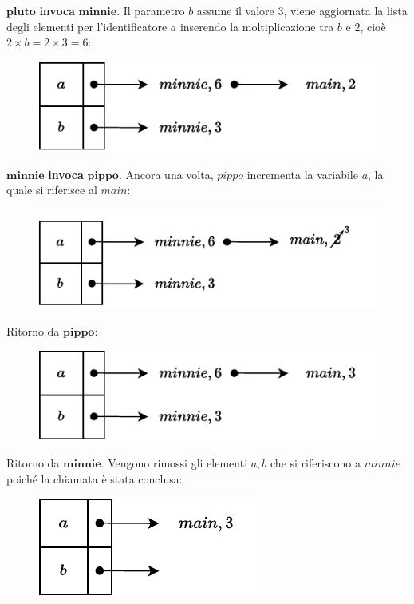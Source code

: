 \documentclass[a4paper]{article}
\begin{document}
	\noindent
	$\mathbf{pluto}$\textbf{ invoca }$\mathbf{minnie}$. Il parametro $b$ assume il valore $3$, viene aggiornata la lista degli elementi per l'identificatore $a$ inserendo la moltiplicazione tra $b$ e $2$, cioè $2 \times b = 2 \times 3 = 6$:
	\begin{figure}[!htp]
		\centering
		\includegraphics[width=.8\textwidth]{img/ex3-010.pdf}
	\end{figure}
	
	\noindent
	$\mathbf{minnie}$\textbf{ invoca }$\mathbf{pippo}$. Ancora una volta, $pippo$ incrementa la variabile $a$, la quale si riferisce al $main$:
	\begin{figure}[!htp]
		\centering
		\includegraphics[width=.8\textwidth]{img/ex3-011.pdf}
	\end{figure}
	
	\noindent
	Ritorno da $\mathbf{pippo}$:
	\begin{figure}[!htp]
		\centering
		\includegraphics[width=.8\textwidth]{img/ex3-012.pdf}
	\end{figure}
	
	\noindent
	Ritorno da $\mathbf{minnie}$. Vengono rimossi gli elementi $a,b$ che si riferiscono a $minnie$ poiché la chiamata è stata conclusa:
	\begin{figure}[!htp]
		\centering
		\includegraphics[width=.5\textwidth]{img/ex3-013.pdf}
	\end{figure}
	
\end{document}
